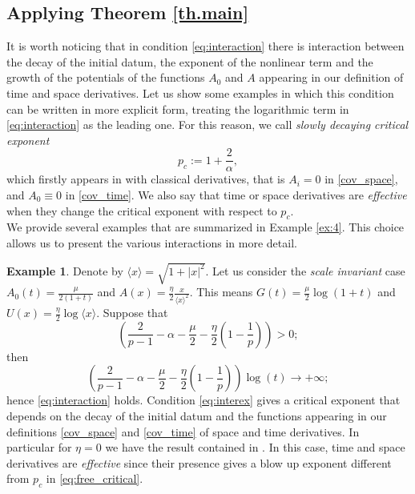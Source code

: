 \documentclass[11pt,reqno]{amsart}
\theoremstyle{definition}
\newtheorem{example}{Example}
\numberwithin{equation}{section}
\begin{document}
\subsection{ Applying Theorem \ref{th.main}} 
\label{sec:examples}
    It is worth noticing that in condition \eqref{eq:interaction} there is interaction between the decay of the initial datum, the exponent of the nonlinear term and the growth of the potentials of the functions $A_0$ and $A$ appearing in our definition of time and space derivatives.  Let us show some examples in which this condition can be written in more explicit form, treating the logarithmic term in \eqref{eq:interaction} as the leading one. For this reason, we call \textit{slowly decaying critical exponent}
    \begin{equation}
    \label{eq:free_critical}
    p_c:=1+\frac{2}{\alpha},
    \end{equation}
    which firstly appears in \cite[Theorem 1.2]{takamura1995} with classical derivatives, that is 
    $A_i=0$ in \eqref{cov_space}, and $A_0\equiv 0$ in \eqref{cov_time}. We also say that time or space derivatives are \emph{effective} when they  change the critical exponent with respect to $p_c$.\\
    We provide several examples that are summarized in Example \ref{ex:4}. This choice allows us to present the various interactions in more detail.
\begin{example} 
\label{ex:scaleinvariant}
Denote by $\langle x \rangle = \sqrt{1+|x|^2}$. Let us consider the \textit{scale invariant} case $A_0(t)=\frac{\mu}{2(1+t)}$ and $A(x)=\frac{\eta}{2}\frac{x}{\langle x \rangle^2}.$ This means $G(t)=\frac{\mu}{2}\log(1+t)$ and $U(x)=\frac{\eta}{2}\log\langle x \rangle$.
%
Suppose that 
\begin{equation}\label{eq:interex}
\left(\frac{2}{p-1}-\alpha-\frac{\mu}{2}-\frac{\eta}{2}\left(1-\frac{1}{p}\right)\right)>0;
\end{equation}
then 
\[
\left(\frac{2}{p-1}-\alpha-\frac{\mu}{2}-\frac{\eta}{2}\left(1-\frac{1}{p}\right)\right)\log(t)\to +\infty;
\]
hence \eqref{eq:interaction} holds. Condition \eqref{eq:interex} gives a critical exponent that depends on the decay of the initial datum and  the functions appearing in our definitions \eqref{cov_space} and \eqref{cov_time} of space and time derivatives. 
In particular for $\eta=0$ we have the result contained in \cite{CGL2021}. In this case, time and space derivatives are \emph{effective} since their presence gives a blow up exponent different from $p_c$ in \eqref{eq:free_critical}.
\end{example}
\end{document}
